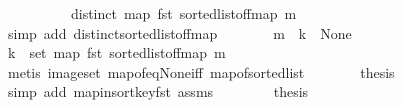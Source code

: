 \begin{isabellebody}
\ \ \isamarkupfalse%
\ {\isacharminus}{\kern0pt}\isanewline
\ \ \ \ \isamarkupfalse%
\ {\isachardoublequoteopen}distinct\ {\isacharparenleft}{\kern0pt}map\ fst\ {\isacharparenleft}{\kern0pt}sorted{\isacharunderscore}{\kern0pt}list{\isacharunderscore}{\kern0pt}of{\isacharunderscore}{\kern0pt}fmap\ m{\isacharparenright}{\kern0pt}{\isacharparenright}{\kern0pt}{\isachardoublequoteclose}\isanewline
\ \ \ \ \ \ \isamarkupfalse%
\ {\isacharparenleft}{\kern0pt}simp\ add{\isacharcolon}{\kern0pt}\ distinct{\isacharunderscore}{\kern0pt}sorted{\isacharunderscore}{\kern0pt}list{\isacharunderscore}{\kern0pt}of{\isacharunderscore}{\kern0pt}fmap{\isacharparenright}{\kern0pt}\isanewline
\ \ \ \ \isamarkupfalse%
\ \isamarkupfalse%
\ {\isacartoucheopen}m\ {\isachardollar}{\kern0pt}{\isachardollar}{\kern0pt}\ k\ {\isacharequal}{\kern0pt}\ None{\isacartoucheclose}\ \isamarkupfalse%
\ {\isachardoublequoteopen}k\ {\isasymnotin}\ set\ {\isacharparenleft}{\kern0pt}map\ fst\ {\isacharparenleft}{\kern0pt}sorted{\isacharunderscore}{\kern0pt}list{\isacharunderscore}{\kern0pt}of{\isacharunderscore}{\kern0pt}fmap\ m{\isacharparenright}{\kern0pt}{\isacharparenright}{\kern0pt}{\isachardoublequoteclose}\isanewline
\ \ \ \ \ \ \isamarkupfalse%
\ {\isacharparenleft}{\kern0pt}metis\ image{\isacharunderscore}{\kern0pt}set\ map{\isacharunderscore}{\kern0pt}of{\isacharunderscore}{\kern0pt}eq{\isacharunderscore}{\kern0pt}None{\isacharunderscore}{\kern0pt}iff\ map{\isacharunderscore}{\kern0pt}of{\isacharunderscore}{\kern0pt}sorted{\isacharunderscore}{\kern0pt}list{\isacharparenright}{\kern0pt}\isanewline
\ \ \ \ \isamarkupfalse%
\ \isamarkupfalse%
\ {\isacharquery}{\kern0pt}thesis\isanewline
\ \ \ \ \ \ \isamarkupfalse%
\ {\isacharparenleft}{\kern0pt}simp\ add{\isacharcolon}{\kern0pt}\ map{\isacharunderscore}{\kern0pt}insort{\isacharunderscore}{\kern0pt}key{\isacharunderscore}{\kern0pt}fst\ assms{\isacharparenleft}{\kern0pt}{}{\isacharcomma}{\kern0pt}{}{\isacharparenright}{\kern0pt}{\isacharparenright}{\kern0pt}\isanewline
\ \ \isamarkupfalse%
\isanewline
\ \ \isamarkupfalse%
\ \isamarkupfalse%
\ {\isacharquery}{\kern0pt}thesis\ \isacommand{{\isachardot}{\kern0pt}}\isamarkupfalse%
\isanewline
{}\isamarkupfalse%
%
\endisatagproof
{\isafoldproof}%
%
\isadelimproof
\isanewline
%
\endisadelimproof
\isanewline
{}\isamarkupfalse%

\end{isabellebody}
